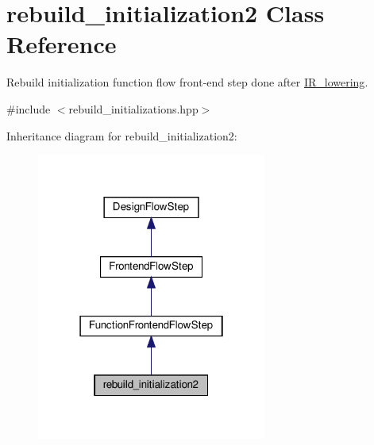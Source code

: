 \hypertarget{classrebuild__initialization2}{}\section{rebuild\+\_\+initialization2 Class Reference}
\label{classrebuild__initialization2}


Rebuild initialization function flow front-\/end step done after \hyperlink{classIR__lowering}{I\+R\+\_\+lowering}.  




{\ttfamily \#include $<$rebuild\+\_\+initializations.\+hpp$>$}



Inheritance diagram for rebuild\+\_\+initialization2\+:
\nopagebreak
\begin{figure}[H]
\begin{center}
\leavevmode
\includegraphics[width=214pt]{db/d24/classrebuild__initialization2__inherit__graph}
\end{center}
\end{figure}


